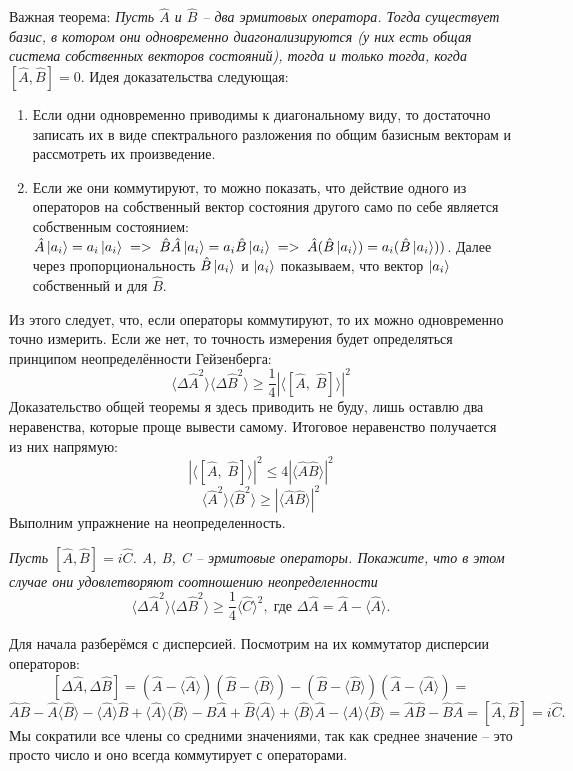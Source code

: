 Важная теорема: \textit{Пусть $\hat{A}$ и $\hat{B}$ -- два эрмитовых оператора. Тогда существует базис, в котором они одновременно диагонализируются (у них есть общая система собственных векторов состояний), тогда и только тогда, когда $[\hat{A}, \hat{B}] = 0$}. Идея доказательства следующая:
\begin{enumerate}
    \item Если одни одновременно приводимы к диагональному виду, то достаточно записать их в виде спектрального разложения по общим базисным векторам и рассмотреть их произведение.
    \item Если же они коммутируют, то можно показать, что действие одного из операторов на собственный вектор состояния другого само по себе является собственным состоянием: $\hat{A}\ket{a_i} = a_i\ket{a_i}\; => \; \hat{B}\hat{A}\ket{a_i} = a_i\hat{B}\ket{a_i} \; => \; \hat{A}(\hat{B}\ket{a_i}) = a_i(\hat{B}\ket{a_i}))$. Далее через пропорциональность $\hat{B}\ket{a_i}$ и $\ket{a_i}$ показываем, что вектор $\ket{a_i}$ собственный и для $\hat{B}$.
\end{enumerate}

Из этого следует, что, если операторы коммутируют, то их можно одновременно точно измерить. Если же нет, то точность измерения будет определяться принципом неопределённости Гейзенберга:
\[
\langle \Delta \hat{A}^2 \rangle \langle \Delta \hat{B}^2 \rangle \geq \frac{1}{4} |\langle [\hat{A}, \; \hat{B}] \rangle|^2
\]
Доказательство общей теоремы я здесь приводить не буду, лишь оставлю два неравенства, которые проще вывести самому. Итоговое неравенство получается из них напрямую:
\[
|\langle [\hat{A}, \; \hat{B}] \rangle|^2 \leq 4|\langle \hat{A}\hat{B}\rangle|^2
\]
\[
\langle \hat{A}^2 \rangle \langle \hat{B}^2 \rangle \geq |\langle \hat{A}\hat{B}\rangle|^2
\]
Выполним упражнение на неопределенность.
\begin{center}
\textit{Пусть $[\hat A, \hat B] = i\hat C$. A, B, C -- эрмитовые операторы. Покажите, что в этом случае они удовлетворяют соотношению неопределенности}
\[
\langle \Delta \hat A^2\rangle \langle \Delta \hat B^2\rangle \geq \frac{1}{4} \langle \hat C\rangle^2,\;\textit{где $\Delta \hat A = \hat A - \langle \hat A \rangle$.}
\]
\end{center}
Для начала разберёмся с дисперсией. Посмотрим на их коммутатор дисперсии операторов:
\[
[\Delta \hat A, \Delta \hat B] = (\hat A - \langle \hat A \rangle)(\hat B - \langle \hat B \rangle) - (\hat B - \langle \hat B \rangle)(\hat A - \langle \hat A \rangle) =\]
\[\hat A \hat B - \hat A \langle \hat B \rangle - \langle \hat A \rangle \hat B + \langle \hat A \rangle \langle \hat B \rangle - \hat B \hat A + \hat B \langle \hat A \rangle + \langle \hat B \rangle \hat A - \langle \hat A \rangle \langle \hat B \rangle = \hat A \hat B - \hat B \hat A = [\hat A, \hat B] = i\hat C.
\]
Мы сократили все члены со средними значениями, так как среднее значение -- это просто число и оно всегда коммутирует с операторами.

